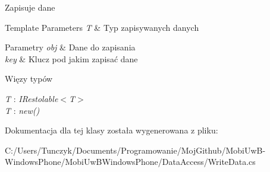 Zapisuje dane 


\begin{DoxyTemplParams}{Template Parameters}
{\em T} & Typ zapisywanych danych\\
\hline
\end{DoxyTemplParams}

\begin{DoxyParams}{Parametry}
{\em obj} & Dane do zapisania\\
\hline
{\em key} & Klucz pod jakim zapisać dane\\
\hline
\end{DoxyParams}
\begin{Desc}
\item[Więzy typów]\begin{description}
\item[{\em T} : {\em I\+Restolable$<$T$>$}]\item[{\em T} : {\em new()}]\end{description}
\end{Desc}


Dokumentacja dla tej klasy została wygenerowana z pliku\+:\begin{DoxyCompactItemize}
\item 
C\+:/\+Users/\+Tunczyk/\+Documents/\+Programowanie/\+Moj\+Github/\+Mobi\+Uw\+B-\/\+Windows\+Phone/\+Mobi\+Uw\+B\+Windows\+Phone/\+Data\+Access/Write\+Data.\+cs\end{DoxyCompactItemize}
